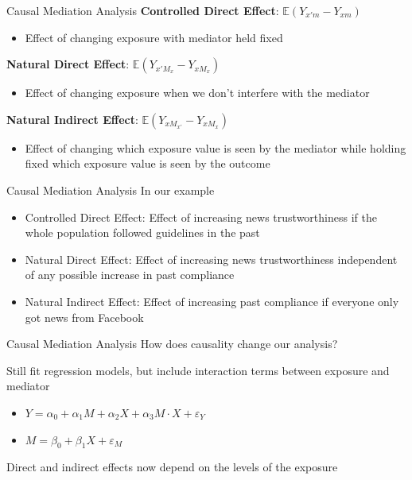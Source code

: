 \documentclass[14pt]{beamer}
\newcommand{\CMA}{Causal Mediation Analysis}
\begin{document}
\begin{frame}{Causal Mediation Analysis}
    \textbf{Controlled Direct Effect}: $\mathbb{E}(Y_{x'm} - Y_{xm})$
    \begin{itemize}
        \item Effect of changing exposure with mediator held fixed \newline
    \end{itemize}

    \textbf{Natural Direct Effect}: $\mathbb{E}(Y_{x'M_{x}} - Y_{xM_{x}})$
    \begin{itemize}
        \item Effect of changing exposure when we don't interfere with the mediator  \newline
    \end{itemize}

    \textbf{Natural Indirect Effect}: $\mathbb{E}(Y_{xM_{x'}} - Y_{xM_{x}})$
    \begin{itemize}
        \item Effect of changing which exposure value is seen by the mediator while holding fixed which exposure value is seen by the outcome
    \end{itemize}
\end{frame}

\begin{frame}{\CMA}
    In our example
    \begin{itemize}
        \item Controlled Direct Effect: Effect of increasing news trustworthiness if the whole population followed guidelines in the past
        \item Natural Direct Effect: Effect of increasing news trustworthiness independent of any possible increase in past compliance
        \item Natural Indirect Effect: Effect of increasing past compliance if everyone only got news from Facebook
    \end{itemize}
\end{frame}

\begin{frame}{\CMA}
    How does causality change our analysis? \newline

    Still fit regression models, but include interaction terms between exposure and mediator
    \begin{itemize}
        \item $Y = \alpha_0 + \alpha_1 M + \alpha_2 X + \alpha_3 M \cdot X + \varepsilon_Y$
        \item $M = \beta_0 + \beta_1 X + \varepsilon_M$ \newline
    \end{itemize}

    Direct and indirect effects now depend on the levels of the exposure

\end{frame}
\end{document}
